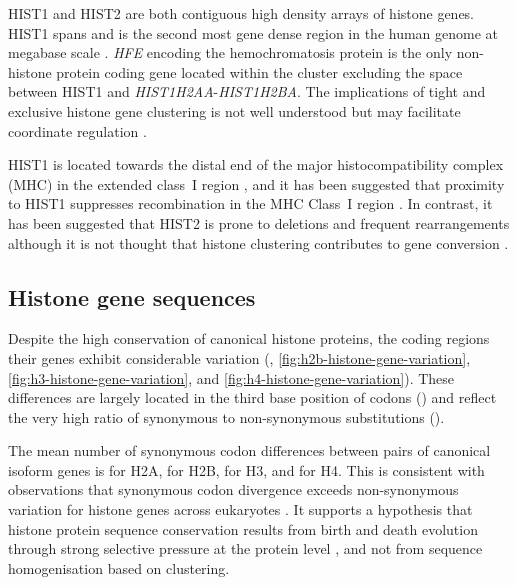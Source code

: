     HIST1 and HIST2 are both contiguous high density arrays of histone genes.
    HIST1 spans \HISTOneSpan{}
    and is the second most gene dense region in the human genome at
    megabase scale \citep{MHC-III-analysis}.
    \textit{HFE} encoding the hemochromatosis protein \citep{AlbigDoenecke1998}
    is the only non-histone protein coding gene located within the cluster
    excluding the space between HIST1 and \textit{HIST1H2AA}-\textit{HIST1H2BA}.
    The implications of tight and exclusive histone gene clustering
    is not well understood but may facilitate coordinate regulation
    \citep{Eirinlopez2009,close-regulators}.

    HIST1 is located towards the distal end of the major histocompatibility complex (MHC)
    in the extended class~I region \citep{MHC-I-transcript, MHC-complete-sequencing-1999},
    and it has been suggested that proximity to HIST1
    suppresses recombination in the MHC Class~I region \citep{MHC-repressed-by-HIST}.
    In contrast, it has been suggested that HIST2 is prone to
    deletions and frequent rearrangements
    \citep{HISTTwo-prone-deletion-discovery, HISTTwo-prone-deletion-focus}
    although it is not thought that histone clustering contributes to
    gene conversion \citep{NeiRooney2005}.

  \subsection{Histone gene sequences}
    Despite the high conservation of canonical histone proteins,
    the coding regions their genes exhibit considerable variation
    (, \ref{fig:h2b-histone-gene-variation},
    \ref{fig:h3-histone-gene-variation}, and \ref{fig:h4-histone-gene-variation}).
    These differences are largely located in the third base position
    of codons ()
    and reflect the very high ratio of synonymous to non-synonymous
    substitutions ().

    The mean number of synonymous codon differences between pairs of canonical isoform genes is
     for H2A,
     for H2B,
     for H3,
    and  for H4.
    This is consistent with observations that
    synonymous codon divergence exceeds non-synonymous variation
    for histone genes across eukaryotes \citep{Piontkivska2002, Rooney2002}.
    It supports a hypothesis that histone protein sequence conservation
    results from birth and death evolution through strong selective pressure
    at the protein level \citep{NeiRooney2005},
    and not from sequence homogenisation based on clustering.

